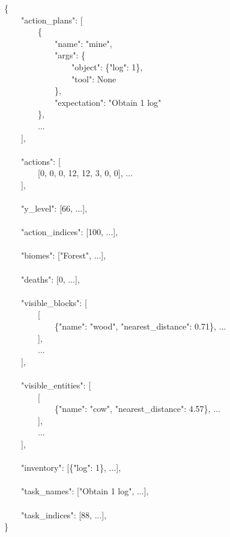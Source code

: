 \{\\
\hbox{\ \ \ \ }"action\_plans": [\\
\hbox{\ \ \ \ \ \ \ \ }\{\\
\hbox{\ \ \ \ \ \ \ \ \ \ \ \ }"name": "mine",\\
\hbox{\ \ \ \ \ \ \ \ \ \ \ \ }"args": \{\\
\hbox{\ \ \ \ \ \ \ \ \ \ \ \ \ \ \ \ }"object": \{"log": 1\},\\
\hbox{\ \ \ \ \ \ \ \ \ \ \ \ \ \ \ \ }"tool": None\\
\hbox{\ \ \ \ \ \ \ \ \ \ \ \ }\},\\
\hbox{\ \ \ \ \ \ \ \ \ \ \ \ }"expectation": "Obtain 1 log"\\
\hbox{\ \ \ \ \ \ \ \ }\}, \\
\hbox{\ \ \ \ \ \ \ \ }...\\
\hbox{\ \ \ \ }],\\
\\
\hbox{\ \ \ \ }"actions": [\\
\hbox{\ \ \ \ \ \ \ \ }[0, 0, 0, 12, 12, 3, 0, 0], ...\\
\hbox{\ \ \ \ }],\\
\\
\hbox{\ \ \ \ }"y\_level": [66, ...],\\
\\
\hbox{\ \ \ \ }"action\_indices": [100, ...],\\
\\
\hbox{\ \ \ \ }"biomes": ["Forest", ...],\\
\\
\hbox{\ \ \ \ }"deaths": [0, ...],\\
\\
\hbox{\ \ \ \ }"visible\_blocks": [\\
\hbox{\ \ \ \ \ \ \ \ }[\\
\hbox{\ \ \ \ \ \ \ \ \ \ \ \ }\{"name": "wood", "nearest\_distance": 0.71\}, ...\\
\hbox{\ \ \ \ \ \ \ \ }],\\
\hbox{\ \ \ \ \ \ \ \ }...\\
\hbox{\ \ \ \ }],\\
\\
\hbox{\ \ \ \ }"visible\_entities": [\\
\hbox{\ \ \ \ \ \ \ \ }[\\
\hbox{\ \ \ \ \ \ \ \ \ \ \ \ }\{"name": "cow", "nearest\_distance": 4.57\}, ...\\
\hbox{\ \ \ \ \ \ \ \ }],\\
\hbox{\ \ \ \ \ \ \ \ }...\\
\hbox{\ \ \ \ }],\\
\\
\hbox{\ \ \ \ }"inventory": [\{"log": 1\}, ...],\\
\\
\hbox{\ \ \ \ }"task\_names": ["Obtain 1 log", ...],\\
\\
\hbox{\ \ \ \ }"task\_indices": [88, ...],\\
\}
